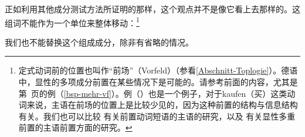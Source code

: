 正如利用其他成分测试方法所证明的那样，这个观点并不是像它看上去那样的。这组词不能作为一个单位来整体移动：\footnote{%
定式动词前的位置也叫作“前场”（Vorfeld）（参看\ref{Abschnitt-Toplogie}）。德语中，显性的多项成分前置在某些情况下是可能的。请参考前面的内容，尤其是第~\pageref{bsp-mehr-vf}页的例（\ref{bsp-mehr-vf}）。例（）也是一个例子，对于kaufen（买）这类动词来说，主语在前场的位置上是比较少见的，因为这种前置的结构与信息结构有关。我们也可以比较\citealp{dKM2003a} 有关前置动词短语的主语的研究，以及\citealp[]{BC2010a} 有关显性多重前置的主语前置方面的研究。
}
\z

\noindent
我们也不能替换这个组成成分，除非有省略的情况。

